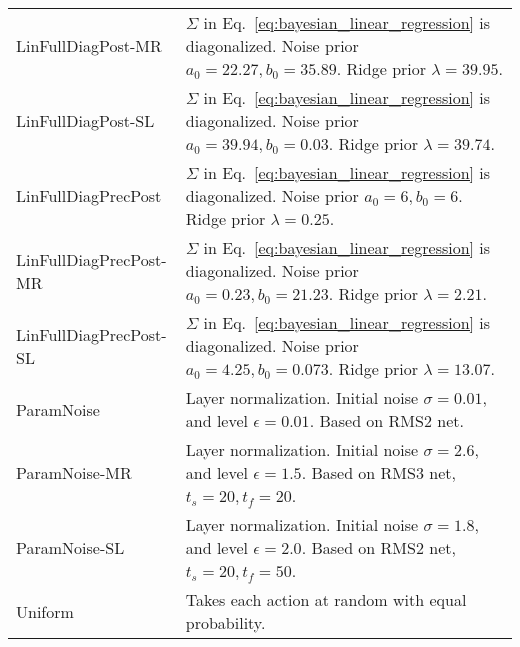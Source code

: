 \documentclass{article} \usepackage{iclr2018_conference,times}
\begin{document}
\begin{table}[ht]
\begin{adjustbox}{center}
\begin{tabular}{ll}
LinFullDiagPost-MR & $\Sigma$ in Eq.~\ref{eq:bayesian_linear_regression} is diagonalized. Noise prior $a_0 = 22.27, b_0 = 35.89$. Ridge prior $\lambda = 39.95$. \\
LinFullDiagPost-SL & $\Sigma$ in Eq.~\ref{eq:bayesian_linear_regression} is diagonalized. Noise prior $a_0 = 39.94, b_0 = 0.03$. Ridge prior $\lambda = 39.74$. \\
LinFullDiagPrecPost & $\Sigma$ in Eq.~\ref{eq:bayesian_linear_regression} is diagonalized. Noise prior $a_0 = 6, b_0 = 6$. Ridge prior $\lambda = 0.25$. \\
LinFullDiagPrecPost-MR & $\Sigma$ in Eq.~\ref{eq:bayesian_linear_regression} is diagonalized. Noise prior $a_0 = 0.23, b_0 = 21.23$. Ridge prior $\lambda = 2.21$. \\
LinFullDiagPrecPost-SL & $\Sigma$ in Eq.~\ref{eq:bayesian_linear_regression} is diagonalized. Noise prior $a_0 = 4.25, b_0 = 0.073$. Ridge prior $\lambda = 13.07$. \\
ParamNoise & Layer normalization. Initial noise $\sigma = 0.01$, and level $\epsilon = 0.01$. Based on RMS2 net.  \\
ParamNoise-MR & Layer normalization. Initial noise $\sigma = 2.6$, and level $\epsilon = 1.5$. Based on RMS3 net, $t_s = 20, t_f = 20$.  \\
ParamNoise-SL & Layer normalization. Initial noise $\sigma = 1.8$, and level $\epsilon = 2.0$. Based on RMS2 net, $t_s = 20, t_f = 50$. \\
Uniform & Takes each action at random with equal probability. \\
    \bottomrule
  \end{tabular}
\end{adjustbox}
\end{table}
\end{document}
